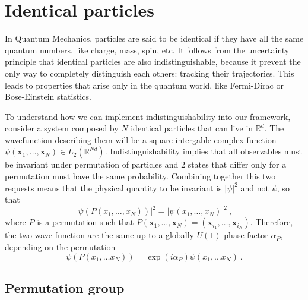 \chapter{Identical particles}

    In Quantum Mechanics, particles are said to be identical if they have all the same quantum numbers, like charge, mass, spin, etc. It follows from the uncertainty principle that identical particles are also indistinguishable, because it prevent the only way to completely distinguish each others: tracking their trajectories. This leads to properties that arise only in the quantum world, like Fermi-Dirac or Bose-Einstein statistics.

    To understand how we can implement indistinguishability into our framework, consider a system composed by $N$ identical particles that can live in $\mathbb R^d$. The wavefunction describing them will be a square-intergable complex function $\psi(\mathbf x_1, \ldots, \mathbf x_N) \in L_2(\mathbb R^{Nd})$. Indistinguishability implies that all observables must be invariant under permutation of particles and $2$ states that differ only for a permutation must have the same probability. Combining together this two requests means that the physical quantity to be invariant is $|\psi|^2$ and not $\psi$, so that 
    \begin{equation*}
        |\psi(P(x_1, \ldots, x_N))|^2 = |\psi(x_1, \ldots, x_N)|^2 ~,
    \end{equation*}
    where $P$ is a permutation such that $P(\mathbf x_1, \ldots, \mathbf x_N) = (\mathbf x_{i_1}, \ldots, \mathbf x_{i_N})$. Therefore, the two wave function are the same up to a globally $U(1)$ phase factor $\alpha_P$, depending on the permutation
    \begin{equation}\label{perm:phase}
        \psi(P(x_1, \ldots x_N)) = \exp(i \alpha_P) \psi (x_1, \ldots x_N) ~.
    \end{equation}

\section{Permutation group}

